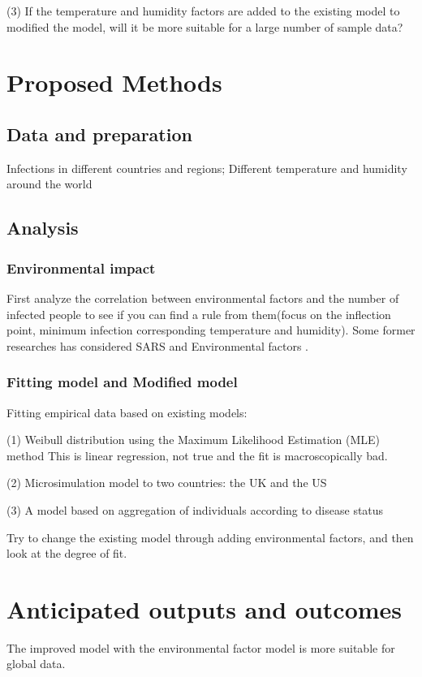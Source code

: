 \documentclass[11pt]{article}
\begin{document}
(3) If the temperature and humidity factors are added to the existing model to modified the model, will it be more suitable for a large number of sample data?

\section{Proposed Methods}
\subsection{Data and preparation}
Infections in different countries and regions;
Different temperature and humidity around the world
\subsection{ Analysis}
\subsubsection{ Environmental  impact}
First analyze the correlation between environmental factors and the number of infected people to see if you can find a rule from them(focus on the inflection point, minimum infection corresponding temperature and humidity). Some former researches has considered SARS and Environmental factors \citep{R9, R10}.

\subsubsection{ Fitting model and Modified model}
Fitting empirical data based on existing models:

(1) Weibull distribution using the Maximum Likelihood Estimation (MLE) method \citep{R2} 
This is linear regression, not true and the fit is macroscopically bad.

(2) Microsimulation model to two countries: the UK  and the US \citep{R4}

(3) A model based on aggregation of individuals according to disease status \citep{R15}

Try to change the existing model through adding environmental factors, and then look at the degree of fit. 

\section{Anticipated outputs and outcomes}
The improved model with the environmental factor model is more suitable for global data. 
\end{document}
